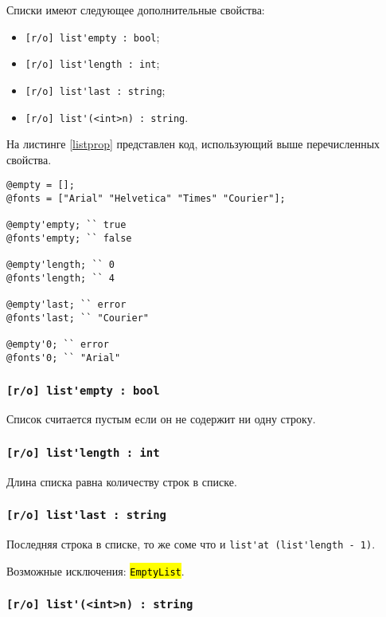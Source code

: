 \documentclass[a4paper, 14pt]{extarticle}
\newcommand{\ferror}[1]{\foreignlanguage{english}{\fontsize{11pt}{12pt}\tt{\sethlcolor{yellow}\hl{#1}}}}
\newenvironment{icItems}
	{ \begin{itemize} [noitemsep,nolistsep] }
	{ \end{itemize} }
\begin{document}
Списки имеют следующее дополнительные свойства:
\begin{icItems}
\item
	\lstinline|[r/o] list'empty : bool|;
\item
	\lstinline|[r/o] list'length : int|;
\item
	\lstinline|[r/o] list'last : string|;
\item
	\lstinline|[r/o] list'(<int>n) : string|.
\end{icItems}

На листинге \ref{listprop} представлен код, использующий выше перечисленных свойства.

\begin{lstlisting}[caption=Свойства класса list, label=listprop]
@empty = [];
@fonts = ["Arial" "Helvetica" "Times" "Courier"];

@empty'empty; `` true
@fonts'empty; `` false

@empty'length; `` 0
@fonts'length; `` 4

@empty'last; `` error
@fonts'last; `` "Courier"

@empty'0; `` error
@fonts'0; `` "Arial"
\end{lstlisting}

\subsubsection{\lstinline|[r/o] list'empty : bool|}

Список считается пустым если он не содержит ни одну строку.

\subsubsection{\lstinline|[r/o] list'length : int|}

Длина списка равна количеству строк в списке.

\subsubsection{\lstinline|[r/o] list'last : string|}

Последняя строка в списке, то же соме что и \lstinline|list'at (list'length - 1)|.

Возможные исключения: \ferror{EmptyList}.

\subsubsection{\lstinline|[r/o] list'(<int>n) : string|}
\end{document}
